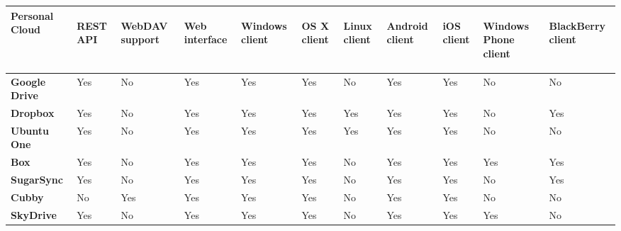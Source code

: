 {{\begin{table}
\begin{center}
\begin{tabular}{ | p{3.0cm} | p{0.9cm} | p{0.9cm} | p{0.9cm} | p{0.9cm} | p{0.9cm} | p{0.9cm} | p{0.9cm} | p{0.9cm} | p{0.9cm} | p{0.9cm} | }
	\textbf{Personal Cloud} &
	\begin{sideways}\textbf{REST API}\end{sideways} &
	\begin{sideways}\textbf{WebDAV support}\end{sideways} &
	\begin{sideways}\textbf{Web interface}\end{sideways} & 
	\begin{sideways}\textbf{Windows client}\end{sideways} &
	\begin{sideways}\textbf{OS X client}\end{sideways} &
	\begin{sideways}\textbf{Linux client}\end{sideways} &
	\begin{sideways}\textbf{Android client}\end{sideways} &
	\begin{sideways}\textbf{iOS client}\end{sideways} &
	\begin{sideways}\textbf{Windows Phone client}\end{sideways} &
	\begin{sideways}\textbf{BlackBerry client}\end{sideways} 	\\ \hline

	\textbf{Google Drive} &
	Yes &
	No &
	Yes &
	Yes &
	Yes &
	No &
	Yes &
	Yes &
	No &
	No \\ \hline

	\textbf{Dropbox} &
	Yes &
	No &
	Yes &
	Yes &
	Yes &
	Yes &
	Yes &
	Yes &
	No &
	Yes \\ \hline
	
	\textbf{Ubuntu One} &
	Yes &
	No &
	Yes &
	Yes &
	Yes &
	Yes &
	Yes &
	Yes &
	No &
	No \\ \hline
	
	\textbf{Box} &
	Yes &
	No &
	Yes &
	Yes &
	Yes &
	No &
	Yes &
	Yes &
	Yes &
	Yes \\ \hline
	
	\textbf{SugarSync} & 
	Yes &
	No &
	Yes &
	Yes &
	Yes &
	No &
	Yes &
	Yes &
	No &
	Yes \\ \hline
	
	\textbf{Cubby} &
	No &
	Yes &
	Yes &
	Yes &
	Yes &
	No &
	Yes &
	Yes &
	No &
	No \\ \hline
	
	\textbf{SkyDrive} & 
	Yes &
	No &
	Yes &
	Yes &
	Yes &
	No &
	Yes &
	Yes &
	Yes &
	No \\ \hline


\end{tabular}
\end{center}
\end{table}}}
